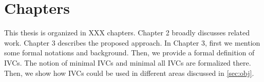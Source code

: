 %
%
%


\section{Chapters}
This thesis is organized in XXX chapters. Chapter 2 broadly discusses related work. Chapter 3 describes the proposed approach. In Chapter 3, first we mention some formal notations and background. Then, we provide a formal definition of IVCs. The notion of minimal IVCs and minimal all IVCs are formalized there. Then, we show how IVCs could be used in different areas discussed in \ref{sec:obj}.

